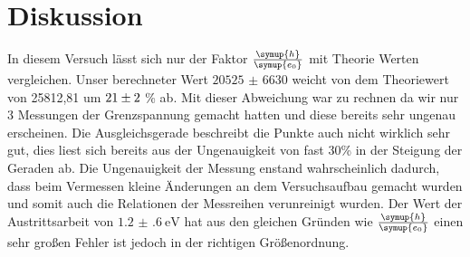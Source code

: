 \section{Diskussion}
    In diesem Versuch lässt sich nur der Faktor $\frac{\symup{h}}{\symup{e_0}}$ mit Theorie Werten vergleichen.
    Unser berechneter Wert $\num{20525(6630)}$ weicht von dem Theoriewert von 25812,81 um $\num{21 (2)}$ \% ab.
    Mit dieser Abweichung war zu rechnen da wir nur 3 Messungen der Grenzspannung gemacht hatten und diese bereits sehr ungenau erscheinen.
    Die Ausgleichsgerade beschreibt die Punkte auch nicht wirklich sehr gut, dies liest sich bereits aus der Ungenauigkeit von fast 30\% in der 
    Steigung der Geraden ab. Die Ungenauigkeit der Messung enstand wahrscheinlich dadurch, dass beim Vermessen kleine Änderungen an dem 
    Versuchsaufbau gemacht wurden und somit auch die Relationen der Messreihen verunreinigt wurden. 
    Der Wert der Austrittsarbeit von $\SI{1.2(6)}{\electronvolt}$ hat aus den gleichen Gründen wie $\frac{\symup{h}}{\symup{e_0}}$ einen sehr 
    großen Fehler ist jedoch in der richtigen Größenordnung.